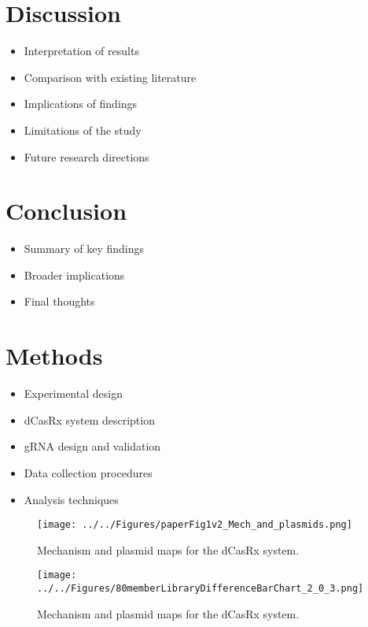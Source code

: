 \documentclass[12pt]{article}
\begin{document}
\section*{Discussion}
\begin{itemize}
    \item Interpretation of results
    \item Comparison with existing literature
    \item Implications of findings
    \item Limitations of the study
    \item Future research directions
\end{itemize}

\section*{Conclusion}
\begin{itemize}
    \item Summary of key findings
    \item Broader implications
    \item Final thoughts
\end{itemize}

\section*{Methods}
\begin{itemize}
    \item Experimental design
    \item dCasRx system description
    \item gRNA design and validation
    \item Data collection procedures
    \item Analysis techniques
\end{itemize}


\citep{Wessels2024} %

\begin{figure}
  \centering
  \texttt{[image: ../../Figures/paperFig1v2\_Mech\_and\_plasmids.png]}
  \caption{Mechanism and plasmid maps for the dCasRx system.}
  \label{fig:fig1}
\end{figure}

\begin{figure}
    \centering
    \texttt{[image: ../../Figures/80memberLibraryDifferenceBarChart\_2\_0\_3.png]}
    \caption{Mechanism and plasmid maps for the dCasRx system.}
    \label{fig:fig2}
\end{figure}
\end{document}
